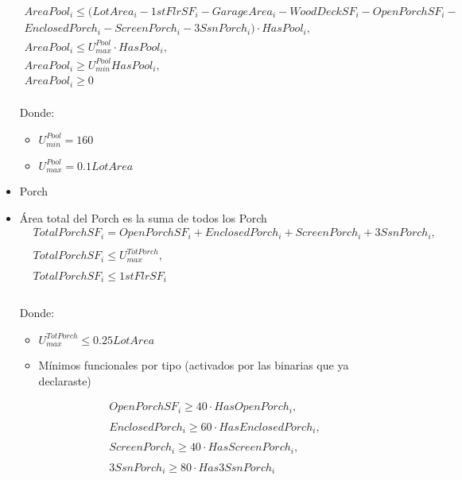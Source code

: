 \begin{itemize}
\begin{align}
AreaPool_i \le \Big(LotArea_i - 1stFlrSF_i - GarageArea_i - WoodDeckSF_i - OpenPorchSF_i - \\EnclosedPorch_i - ScreenPorch_i - 3SsnPorch_i\Big)\cdot HasPool_i,\\
AreaPool_i \le U_{max}^{Pool}\cdot HasPool_i,\qquad\\
AreaPool_i \ge U_{min}^{Pool} HasPool_i,\qquad\\
AreaPool_i \ge 0
\end{align}
\\
Donde:
    \begin{itemize}
        \item $U_{min}^{Pool}=160$
        \item $U_{max}^{Pool}= 0.1 LotArea$
    \end{itemize}
\cite{NAHB2023}

    \item {Porch}\\
    \item {Área total del Porch es la suma de todos los Porch}
\begin{align}
& TotalPorchSF_i = OpenPorchSF_i + EnclosedPorch_i + ScreenPorch_i + 3SsnPorch_i,\\
\\
& TotalPorchSF_i \le U_{max}^{TotPorch},\\
\\
& TotalPorchSF_i \le 1stFlrSF_i\\
\end{align}
\\
Donde: 
    \begin{itemize}
        \item $U_{max}^{TotPorch} \leq 0.25 LotArea$\\

    \item {Mínimos funcionales por tipo (activados por las binarias que ya declaraste)}\\
    \end{itemize}
 
\begin{align}
& OpenPorchSF_i \ge 40 \cdot HasOpenPorch_i,\\
\\
& EnclosedPorch_i \ge 60 \cdot HasEnclosedPorch_i,\\
\\
& ScreenPorch_i \ge 40 \cdot HasScreenPorch_i,\\
\\
& 3SsnPorch_i \ge 80 \cdot Has3SsnPorch_i\\
\end{align}


\end{itemize}
